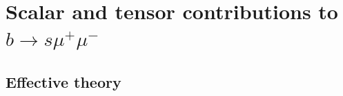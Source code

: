\documentclass[english]{beamer}
\newcommand{\slide}[2][t]{\begin{frame}[#1] \frametitle{\insertsection} #2 \end{frame}}
\begin{document}

\renewcommand{\slide}[2][t]{\begin{frame}[#1] \frametitle{\insertsubsectionhead} #2 \end{frame}}

\section{Scalar and tensor contributions to $ b \to s \mu^+ \mu^- $}

\begin{frame}
\frametitle{\insertsectionhead}
\tableofcontents[currentsection]
\end{frame}

\subsection{Effective theory}
\end{document}
